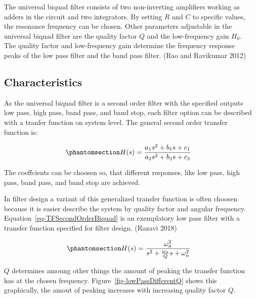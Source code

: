 \documentclass[
  letterpaper,
]{scrbook}
\begin{document}
The universal biquad filter consists of two non-inverting amplifiers
working as adders in the circuit and two integrators. By setting \(R\)
and \(C\) to specific values, the resonance frequency can be chosen.
Other parameters adjustable in the universal biquad filter are the
quality factor \(Q\) and the low-frequency gain \(H_0\). The quality
factor and low-frequency gain determine the frequency response peaks of
the low pass filter and the band pass filter. (Rao and Ravikumar 2012)

\subsection{Characteristics}\label{characteristics}

As the universal biquad filter is a second order filter with the
specified outputs low pass, high pass, band pass, and band stop, each
filter option can be described with a tranfer function on system level.
The general second order transfer function is:

\begin{equation}\phantomsection\label{eq-TFSecondOrder}{
H(s) = \frac{a_1 s^2 + b_1 s + c_1}{a_2 s^2 + b_2 s + c_2}
}\end{equation}

The coeffcients can be choosen so, that different responses, like low
pass, high pass, band pass, and band stop are achieved.

In filter design a variant of this generalized transfer function is
often choosen because it is easier describe the system by quality factor
and angular frequency. Equation~\ref{eq-TFSecondOrderBiquad} is an
exemplatory low pass filter with a transfer function specified for
filter design. (Razavi 2018)

\begin{equation}\phantomsection\label{eq-TFSecondOrderBiquad}{
H(s) = \frac{\omega_n^2}{s^2 + \frac{\omega_n}{Q} s + \omega_n^2}
}\end{equation}

\(Q\) determines amoung other things the amount of peaking the transfer
function has at the chosen frequency. Figure~\ref{fig-lowPassDifferentQ}
shows this graphically, the amout of peaking increases with increasing
quality factor \(Q\).
\end{document}
